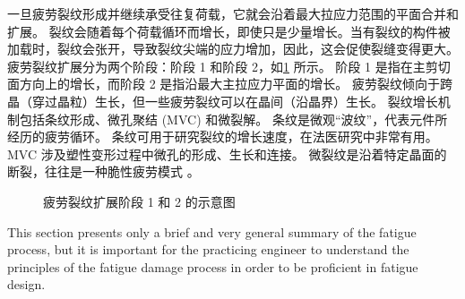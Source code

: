 一旦疲劳裂纹形成并继续承受往复荷载，它就会沿着最大拉应力范围的平面合并和扩展。 裂纹会随着每个荷载循环而增长，即使只是少量增长。当有裂纹的构件被加载时，裂纹会张开，导致裂纹尖端的应力增加，因此，这会促使裂缝变得更大。疲劳裂纹扩展分为两个阶段：阶段 1 和阶段 2，如\cref{fig:crack-growth} 所示。 阶段 1 是指在主剪切面方向上的增长，而阶段 2 是指沿最大主拉应力平面的增长。 疲劳裂纹倾向于跨晶（穿过晶粒）生长，但一些疲劳裂纹可以在晶间（沿晶界）生长。 裂纹增长机制包括条纹形成、微孔聚结 (MVC) 和微裂解。 条纹是微观“波纹”，代表元件所经历的疲劳循环。 条纹可用于研究裂纹的增长速度，在法医研究中非常有用。 MVC 涉及塑性变形过程中微孔的形成、生长和连接。 微裂纹是沿着特定晶面的断裂，往往是一种脆性疲劳模式 \cite{stephens2000m}。

\begin{figure}
  \caption{疲劳裂纹扩展阶段 1 和 2 的示意图\cite{stephens2000m}}
  \label{fig:crack-growth}
\end{figure}

This section presents only a brief and very general summary of the fatigue process, but it is important for the practicing engineer to understand the principles of the fatigue damage process in order to be proficient in fatigue design.

